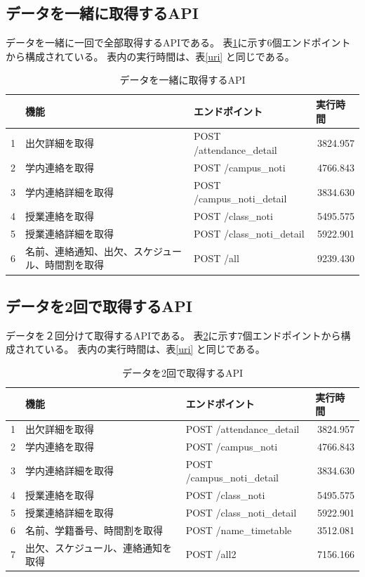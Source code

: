 \documentclass[a4j,12pt,onecolumn,oneside,titlepage,openany,final]{jreport}
\begin{document}
\subsection{データを一緒に取得するAPI}\label{api1}
データを一緒に一回で全部取得するAPIである。
表\ref{uri1}に示す6個エンドポイントから構成されている。
表内の実行時間は、表\ref{uri} と同じである。
\begin{table}[htbp]
\caption{データを一緒に取得するAPI}
\begin{tabular}{|l|l|l|r|}
\hline
   & 機能         & エンドポイント    & \multicolumn{1}{l|}{実行時間} \\ \hline
1  & 出欠詳細を取得                       & POST /attendance\_detail   & 3824.957    \\ \hline
2  & 学内連絡を取得                       & POST /campus\_noti         & 4766.843    \\ \hline
3  & 学内連絡詳細を取得                     & POST /campus\_noti\_detail & 3834.630     \\ \hline
4  & 授業連絡を取得                       & POST /class\_noti          & 5495.575    \\ \hline
5  & 授業連絡詳細を取得                     & POST /class\_noti\_detail  & 5922.901    \\ \hline
6 & 名前、連絡通知、出欠、スケジュール、時間割を取得 & POST /all                  & 9239.430     \\ \hline
\end{tabular}
\label{uri1}
\end{table}
\subsection{データを2回で取得するAPI}\label{api2}
データを２回分けて取得するAPIである。
表\ref{uri2}に示す7個エンドポイントから構成されている。
表内の実行時間は、表\ref{uri} と同じである。
\begin{table}[htbp]
\caption{データを2回で取得するAPI}
\begin{tabular}{|l|l|l|r|}
\hline
   & 機能         & エンドポイント    & \multicolumn{1}{l|}{実行時間} \\ \hline
1  & 出欠詳細を取得                       & POST /attendance\_detail   & 3824.957    \\ \hline
2  & 学内連絡を取得                       & POST /campus\_noti         & 4766.843    \\ \hline
3  & 学内連絡詳細を取得                     & POST /campus\_noti\_detail & 3834.630     \\ \hline
4  & 授業連絡を取得                       & POST /class\_noti          & 5495.575    \\ \hline
5  & 授業連絡詳細を取得                     & POST /class\_noti\_detail  & 5922.901    \\ \hline
6 & 名前、学籍番号、時間割を取得                & POST /name\_timetable      & 3512.081    \\ \hline
7 & 出欠、スケジュール、連絡通知を取得             & POST /all2                 & 7156.166\\ \hline
\end{tabular}
\label{uri2}
\end{table}
\end{document}
